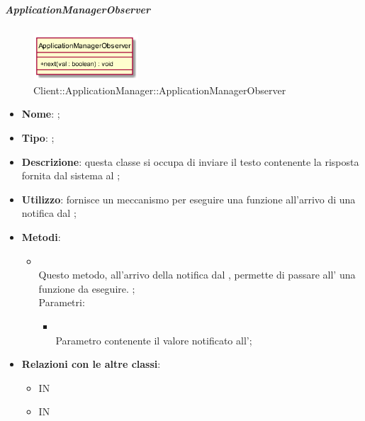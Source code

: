 \hypertarget{ApplicationManagerObserver_label}{\subparagraph{ApplicationManagerObserver}}
\begin{figure}[h]
	\centering
	\includegraphics[width=0.35\textwidth,height=\textheight,keepaspectratio]{images/ClassApplicationManagerObserver.png}
	\caption{Client::ApplicationManager::ApplicationManagerObserver}
\end{figure}
\begin{itemize}
	\item \textbf{Nome}: ;
	\item \textbf{Tipo}: ;
	\item \textbf{Descrizione}: questa classe si occupa di inviare il testo contenente la risposta fornita dal sistema al ;
	\item \textbf{Utilizzo}: fornisce un meccanismo per eseguire una funzione all'arrivo di una notifica dal ;
	\item \textbf{Metodi}:
	\begin{itemize}
		\item[]  \\		Questo metodo, all'arrivo della notifica dal , permette di passare all' una funzione da eseguire.
;\\
		Parametri:
		\begin{itemize}
			\item {} \\
			Parametro contenente il valore notificato all';
		\end{itemize}
	\end{itemize}
	\item \textbf{Relazioni con le altre classi}:
	\begin{itemize}
		\item IN \hyperlink{Manager_label}{}
		\item IN \hyperlink{DataArrivedObservable_label}{}
	\end{itemize}
\end{itemize}
\FloatBarrier

